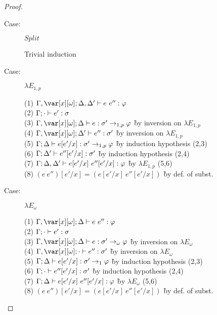 \begin{proof}
\begin{description}
\item[Case:] $Split$
\begin{tabbing}
    Trivial induction
\end{tabbing}

\item[Case:] $\lambda E_{1,p}$
\begin{tabbing}
  (1) $\G, \xo; \D,\D' \vdash e~e'' : \vp$\\
  (2) $\Gamma; \cdot \vdash e' : \sigma$\\
  (3) $\G, \xo; \D \vdash e : \s'\to_{1,p}\vp$ \` by inversion on $\lambda E_{1,p}$\\
  (4) $\G, \xo; \D' \vdash e'' : \s'$ \` by inversion on $\lambda E_{1,p}$\\
  (5) $\Gamma; \Delta \vdash e[e'/x] : \sigma'\to_{1,p}\varphi$ \` by induction hypothesis (2,3)\\
  (6) $\Gamma; \Delta' \vdash e''[e'/x] : \sigma'$ \` by induction hypothesis (2,4)\\
  (7) $\Gamma; \Delta, \Delta' \vdash e[e'/x]~e''[e'/x] : \varphi$ \` by $\lambda E_{1,p}$ (5,6)\\
  (8) $(e~e'')[e'/x] = (e[e'/x]~e''[e'/x])$ \` by def. of subst.\\
\end{tabbing}

\item[Case:] $\lambda E_\omega$
\begin{tabbing}
    (1) $\G, \xo; \D \vdash e~e'' : \vp$\\
    (2) $\Gamma; \cdot \vdash e' : \sigma$\\
    (3) $\G, \xo; \D \vdash e : \s'\to_\omega\vp$ \` by inversion on $\lambda E_\omega$\\
    (4) $\G, \xo; \cdot \vdash e'' : \s'$ \` by inversion on $\lambda E_\omega$\\
    (5) $\Gamma; \Delta \vdash e[e'/x] : \sigma'\to_1\varphi$ \` by induction hypothesis (2,3)\\
    (6) $\Gamma; \cdot \vdash e''[e'/x] : \sigma'$ \` by induction hypothesis (2,4)\\
    (7) $\Gamma; \Delta \vdash e[e'/x]~e''[e'/x] : \varphi$ \` by $\lambda E_\omega$ (5,6)\\
    (8) $(e~e'')[e'/x] = (e[e'/x]~e''[e'/x])$ \` by def. of subst.\\
\end{tabbing}


\end{description}
\end{proof}
